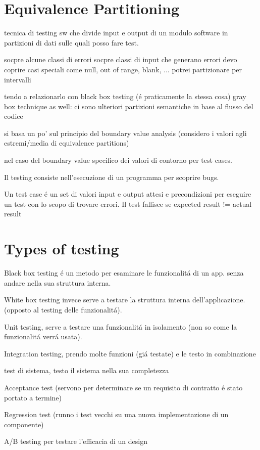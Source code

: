 \section{Equivalence Partitioning}
tecnica di testing sw che divide input e output di un modulo software in 
partizioni di dati sulle quali posso fare test.

socpre alcune classi di errori
socpre classi di input che generano errori
devo coprire casi speciali come null, out of range, blank, ...
potrei partizionare per intervalli

tendo a relazionarlo con black box testing (\'e praticamente la stessa cosa)
gray box technique as well:
ci sono ulteriori partizioni semantiche in base al flusso del codice

si basa un po' sul principio del boundary value analysis (considero i valori 
agli estremi/media di equivalence partitions)

nel caso del boundary value specifico dei valori di contorno per test cases.

Il testing consiste nell'esecuzione di un programma per scoprire bugs.

Un test case \'e un set di valori input e output attesi e precondizioni per 
eseguire un test con lo scopo di trovare errori.
Il test fallisce se expected result != actual result 

\section{Types of testing}
Black box testing \'e un metodo per esaminare le funzionalit\'a di un app.
senza andare nella sua struttura interna.

White box testing invece serve a testare la struttura interna dell'applicazione.
(opposto al testing delle funzionalit\'a).

Unit testing, serve a testare una funzionalit\'a in isolamento (non so 
come la funzionalit\'a verr\'a usata).

Integration testing, prendo molte funzioni (gi\'a testate) e le 
testo in combinazione

test di sistema, testo il sistema nella sua completezza

Acceptance test (servono per determinare se un requisito di contratto \'e 
stato portato a termine)

Regression test (runno i test vecchi su una nuova implementazione di un componente)

A/B testing per testare l'efficacia di un design

